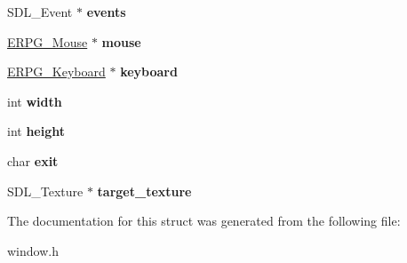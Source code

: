 \begin{DoxyCompactItemize}
\item 
\hypertarget{structERPG__Window_adffd925d259d619f5a49976bb2d0e50d}{S\-D\-L\-\_\-\-Event $\ast$ {\bfseries events}}\label{structERPG__Window_adffd925d259d619f5a49976bb2d0e50d}

\item 
\hypertarget{structERPG__Window_a2b286af3ced62a4611d895a32ca156db}{\hyperlink{structERPG__Mouse}{E\-R\-P\-G\-\_\-\-Mouse} $\ast$ {\bfseries mouse}}\label{structERPG__Window_a2b286af3ced62a4611d895a32ca156db}

\item 
\hypertarget{structERPG__Window_a07ee4e51467b4503cb7f0862c598700f}{\hyperlink{structERPG__Keyboard}{E\-R\-P\-G\-\_\-\-Keyboard} $\ast$ {\bfseries keyboard}}\label{structERPG__Window_a07ee4e51467b4503cb7f0862c598700f}

\item 
\hypertarget{structERPG__Window_af2c74120a4e92aedc6fc06dfddcbe8d6}{int {\bfseries width}}\label{structERPG__Window_af2c74120a4e92aedc6fc06dfddcbe8d6}

\item 
\hypertarget{structERPG__Window_a161d994a0ed64feb877ff1fffbb92ba7}{int {\bfseries height}}\label{structERPG__Window_a161d994a0ed64feb877ff1fffbb92ba7}

\item 
\hypertarget{structERPG__Window_a80e8506f4f278ad5d3de77b6f792ca10}{char {\bfseries exit}}\label{structERPG__Window_a80e8506f4f278ad5d3de77b6f792ca10}

\item 
\hypertarget{structERPG__Window_ae1aff1ec2aaccb3207906299039e237d}{S\-D\-L\-\_\-\-Texture $\ast$ {\bfseries target\-\_\-texture}}\label{structERPG__Window_ae1aff1ec2aaccb3207906299039e237d}

\end{DoxyCompactItemize}


The documentation for this struct was generated from the following file\-:\begin{DoxyCompactItemize}
\item 
window.\-h\end{DoxyCompactItemize}
